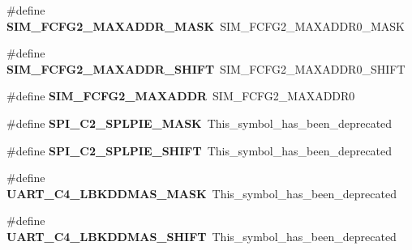 \begin{DoxyCompactItemize}
\#define {\bfseries S\+I\+M\+\_\+\+F\+C\+F\+G2\+\_\+\+M\+A\+X\+A\+D\+D\+R\+\_\+\+M\+A\+SK}~S\+I\+M\+\_\+\+F\+C\+F\+G2\+\_\+\+M\+A\+X\+A\+D\+D\+R0\+\_\+\+M\+A\+SK
\item 
\mbox{\label{group___backward___compatibility___symbols_gae8fbe7e05f4c39ee13322ab15d75d089}} 
\#define {\bfseries S\+I\+M\+\_\+\+F\+C\+F\+G2\+\_\+\+M\+A\+X\+A\+D\+D\+R\+\_\+\+S\+H\+I\+FT}~S\+I\+M\+\_\+\+F\+C\+F\+G2\+\_\+\+M\+A\+X\+A\+D\+D\+R0\+\_\+\+S\+H\+I\+FT
\item 
\mbox{\label{group___backward___compatibility___symbols_gadcad6c136698a35d9732d3d849808a19}} 
\#define {\bfseries S\+I\+M\+\_\+\+F\+C\+F\+G2\+\_\+\+M\+A\+X\+A\+D\+DR}~S\+I\+M\+\_\+\+F\+C\+F\+G2\+\_\+\+M\+A\+X\+A\+D\+D\+R0
\item 
\mbox{\label{group___backward___compatibility___symbols_gadcaa58bac25c102454d3f54da041122f}} 
\#define {\bfseries S\+P\+I\+\_\+\+C2\+\_\+\+S\+P\+L\+P\+I\+E\+\_\+\+M\+A\+SK}~This\+\_\+symbol\+\_\+has\+\_\+been\+\_\+deprecated
\item 
\mbox{\label{group___backward___compatibility___symbols_ga6b417fe91e6264b06ed45234e4bdb987}} 
\#define {\bfseries S\+P\+I\+\_\+\+C2\+\_\+\+S\+P\+L\+P\+I\+E\+\_\+\+S\+H\+I\+FT}~This\+\_\+symbol\+\_\+has\+\_\+been\+\_\+deprecated
\item 
\mbox{\label{group___backward___compatibility___symbols_ga4fbe0c821c729ee10ec2a5398d68e13f}} 
\#define {\bfseries U\+A\+R\+T\+\_\+\+C4\+\_\+\+L\+B\+K\+D\+D\+M\+A\+S\+\_\+\+M\+A\+SK}~This\+\_\+symbol\+\_\+has\+\_\+been\+\_\+deprecated
\item 
\mbox{\label{group___backward___compatibility___symbols_gaa3e4b00c90d731ac214ec241c5739824}} 
\#define {\bfseries U\+A\+R\+T\+\_\+\+C4\+\_\+\+L\+B\+K\+D\+D\+M\+A\+S\+\_\+\+S\+H\+I\+FT}~This\+\_\+symbol\+\_\+has\+\_\+been\+\_\+deprecated
\item 
\mbox{\label{group___backward___compatibility___symbols_ga12f2c283d457dabb4c399413da95290d}} 

\end{DoxyCompactItemize}
